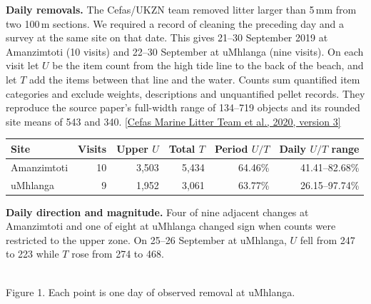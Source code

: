 \documentclass[10pt]{article}
\newcommand{\para}[1]{\medskip\textbf{#1}\enspace}
\newcommand{\src}[2]{\href{#1}{[#2]}}
\begin{document}
\para{Daily removals.}
The Cefas/UKZN team removed litter larger than 5\,mm from two 100\,m sections. We required a record of cleaning the preceding day and a survey at the same site on that date. This gives 21--30 September 2019 at Amanzimtoti (10 visits) and 22--30 September at uMhlanga (nine visits). On each visit let $U$ be the item count from the high tide line to the back of the beach, and let $T$ add the items between that line and the water. Counts sum quantified item categories and exclude weights, descriptions and unquantified pellet records. They reproduce the source paper's full-width range of 134--719 objects and its rounded site means of 543 and 340.
\src{https://doi.org/10.14466/CefasDataHub.95}{Cefas Marine Litter Team et al., 2020, version 3}

\begin{center}
\begin{tabular}{lrrrrr}\toprule
Site & Visits & Upper $U$ & Total $T$ & Period $U/T$ & Daily $U/T$ range\\\midrule
Amanzimtoti & 10 & 3,503 & 5,434 & 64.46\% & 41.41--82.68\%\\
uMhlanga & 9 & 1,952 & 3,061 & 63.77\% & 26.15--97.74\%\\\bottomrule
\end{tabular}
\end{center}

\para{Daily direction and magnitude.}
Four of nine adjacent changes at Amanzimtoti and one of eight at uMhlanga changed sign when counts were restricted to the upper zone. On 25--26 September at uMhlanga, $U$ fell from 247 to 223 while $T$ rose from 274 to 468.

\newpage
\begin{center}
\\
{\small Figure 1. Each point is one day of observed removal at uMhlanga.}
\end{center}
\end{document}
